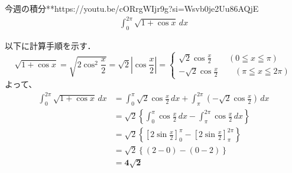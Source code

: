 \documentclass[main]{subfiles}
\begin{document}

\begin{mondai}{2}{今週の積分}{**}{https://youtu.be/cORrgWIjr9g?si=Wsvb0je2Uu86AQjE}
    \begin{align*}
        \int_0^{2\pi} \sqrt{1+\cos x} \, dx
    \end{align*}
\end{mondai}


\solutionhead
\hfill
以下に計算手順を示す．
\hfill\
\begin{equation*}
    \sqrt{1+\cos x} = \sqrt{2\cos ^2 \frac{x}{2}} = \sqrt{2}\left| \cos \frac{x}{2} \right| = 
    \begin{cases}
        \sqrt{2} \cos \frac{x}{2} \qquad (0\leqq x \leqq \pi)\\
        -\sqrt{2} \cos \frac{x}{2} \qquad (\pi\leqq x \leqq 2\pi)
    \end{cases}
\end{equation*}
よって、
\begin{align*}
    \int ^{2\pi}_0 \sqrt{1+\cos x} \, dx
        &= \int^\pi_0 \sqrt{2} \cos \frac{x}{2} \, dx + \int^{2\pi}_\pi \left(-\sqrt{2} \cos \frac{x}{2}\right) \, dx \\
        &= \sqrt{2} \left\{\int^\pi_0 \cos \frac{x}{2} \, dx - \int^{2\pi}_\pi \cos \frac{x}{2} \, dx \right\} \\
        &= \sqrt{2} \left\{ \left[ 2\sin \frac{x}{2} \right]^\pi_0 - \left[ 2\sin \frac{x}{2} \right]^{2\pi}_\pi \right\} \\
        &= \sqrt{2} \left\{ (2-0) - (0-2) \right\} \\
        &= \boldsymbol{4 \sqrt{2}}
\end{align*}
\end{document}
